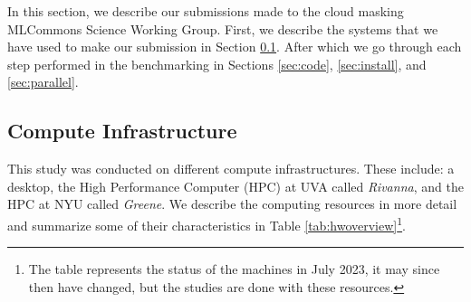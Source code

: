 \documentclass[sigplan,screen]{acmart}
\begin{document}
In this section, we describe our submissions made to the cloud masking MLCommons Science Working Group. First, we describe the systems that we have used to make our submission in Section \ref{sec:hw}. After which we go through each step performed in the benchmarking in Sections \ref{sec:code}, \ref{sec:install}, and \ref{sec:parallel}.

\subsection{Compute Infrastructure}
\label{sec:hw}

This study was conducted on different compute infrastructures. These include: a desktop, the High Performance Computer (HPC) at UVA called {\em Rivanna}, and the HPC at NYU called {\em Greene}. We describe the computing resources in more detail and summarize some of their characteristics in Table \ref{tab:hwoverview}\footnote{The table represents the status of the machines in July 2023, it may since then have changed, but the studies are done with these resources.}.
\end{document}
